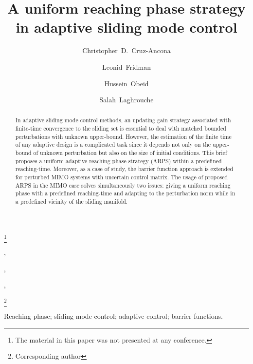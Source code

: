 \documentclass[twocolumn]{autart}    %
\begin{document}
\begin{frontmatter}

\title{A uniform reaching phase strategy in adaptive sliding mode control } %

\thanks[footnoteinfo]{The material in this paper was not presented at any conference. }

\author[a]{Christopher~D.~Cruz-Ancona},    %
\author[a]{Leonid~Fridman},  %
\author[b]{Hussein~Obeid},
\author[b]{Salah~Laghrouche}

\address[a]{Facultad de Ingenier\'ia, Universidad Nacional Aut\'onoma de M\'exico (UNAM), Ciudad de M\'exico 04510, M\'exico}  %
\address[b]{Femto-ST UMR CNRS. Univ. Bourgogne Franche-Comt\'e/UTBM, 90010, Belfort, France}             %
\thanks[coraut]{Corresponding author}

          
\begin{keyword}                           %
 Reaching phase; sliding mode control; adaptive control; barrier functions.         %
\end{keyword}                             %


\begin{abstract}                          %
In adaptive sliding mode control methods, an updating gain strategy associated with finite-time convergence to the sliding set is essential to deal with matched bounded perturbations with unknown upper-bound. However, the estimation of the finite time of any adaptive design is a complicated task since it depends not only on the upper-bound of unknown perturbation but also on the size of initial conditions. This brief proposes a uniform adaptive reaching phase strategy (ARPS) within a predefined reaching-time.  Moreover, as a case of study, the barrier function approach is extended for perturbed MIMO systems with uncertain control matrix. The usage of proposed ARPS in the MIMO case solves simultaneously two issues: giving a uniform reaching phase with a predefined reaching-time and adapting to the perturbation norm while in a predefined vicinity of the sliding manifold.


\end{abstract}
\end{frontmatter}
\end{document}

